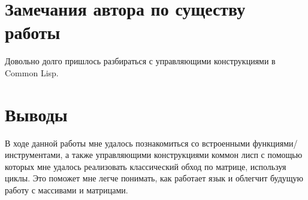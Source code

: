 \documentclass[12pt]{article}
\begin{document}
\section{Замечания автора по существу работы}
Довольно долго пришлось разбираться с управляющими конструкциями в Common Lisp.

\section{Выводы}
В ходе данной работы мне удалось познакомиться со встроенными функциями/инструментами, а также управляющими конструкциями коммон лисп с помощью которых мне удалось реализовать классический обход по матрице, используя циклы. Это поможет мне легче понимать, как работает язык и облегчит будущую работу с массивами и матрицами.
\end{document}
